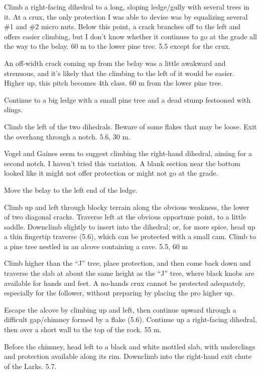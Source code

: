 \documentclass{tahquitz}
\begin{document}
 Climb a right-facing dihedral to a long, sloping ledge/gully with
several trees in it. At a crux, the only protection I was able to devise was by
equalizing several \#1 and \#2 micro nuts. Below this point, a crack branches off
to the left and offers easier climbing, but I don't know whether it continues
to go at the grade all the way to the belay. 60 m to the lower pine tree. 5.5 except for
the crux.

 An off-width crack coming up from the belay was a little awakward and strenuous, and
it's likely that the climbing to the left of it would be easier. Higher up, this pitch
becomes 4th class. 60 m from the lower pine tree.

 Continue to a big ledge with a small pine tree and a dead stump festooned with
slings.

 Climb the left of the two dihedrals. Beware of some flakes that may be loose.
Exit the overhang through a notch. 5.6, 30 m.

 Vogel and Gaines seem to suggest climbing the right-hand dihedral,
aiming for a second notch. I haven't tried this variation.
A blank section near the bottom looked like it might not
offer protection or might not go at the grade.

 Move the belay to the left end of the ledge.


 Climb up and left through blocky terrain along the obvious weakness, the
lower of two diagonal cracks. Traverse left at the obvious opportune point, to a
little saddle. Downclimb slightly to insert into the dihedral; or, for more spice,
head up a thin fingertip traverse (5.6),
which can be protected with a small cam.
Climb to a pine tree nestled in an alcove containing a cave. 5.5, 60 m

 Climb higher than the ``J'' tree, place protection, and then come
back down and traverse the slab at about the same height as the ``J'' tree, where black
knobs are available for hands and feet. A no-hands crux cannot be protected adequately,
especially for the follower, without preparing by placing the pro higher up.

 Escape the alcove by climbing up and left, then continue upward through a
difficult gap/chimney formed by a flake (5.6). Continue up a right-facing dihedral, then
over a short wall to the top
of the rock. 55 m.

 Before the chimney, head left to a black and white mottled slab, with underclings
and protection available along its rim. Downclimb into the right-hand exit chute of the Larks. 5.7.
\end{document}
